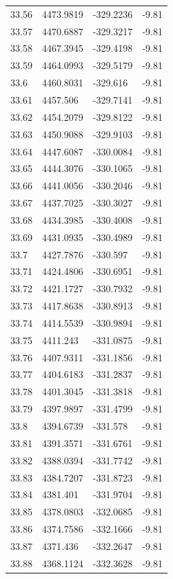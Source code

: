 \begin{table}[H]
\begin{tabular}{llll}
33.56 & 4473.9819 & -329.2236 & -9.81 \\
33.57 & 4470.6887 & -329.3217 & -9.81 \\
33.58 & 4467.3945 & -329.4198 & -9.81 \\
33.59 & 4464.0993 & -329.5179 & -9.81 \\
33.6 & 4460.8031 & -329.616 & -9.81 \\
33.61 & 4457.506 & -329.7141 & -9.81 \\
33.62 & 4454.2079 & -329.8122 & -9.81 \\
33.63 & 4450.9088 & -329.9103 & -9.81 \\
33.64 & 4447.6087 & -330.0084 & -9.81 \\
33.65 & 4444.3076 & -330.1065 & -9.81 \\
33.66 & 4441.0056 & -330.2046 & -9.81 \\
33.67 & 4437.7025 & -330.3027 & -9.81 \\
33.68 & 4434.3985 & -330.4008 & -9.81 \\
33.69 & 4431.0935 & -330.4989 & -9.81 \\
33.7 & 4427.7876 & -330.597 & -9.81 \\
33.71 & 4424.4806 & -330.6951 & -9.81 \\
33.72 & 4421.1727 & -330.7932 & -9.81 \\
33.73 & 4417.8638 & -330.8913 & -9.81 \\
33.74 & 4414.5539 & -330.9894 & -9.81 \\
33.75 & 4411.243 & -331.0875 & -9.81 \\
33.76 & 4407.9311 & -331.1856 & -9.81 \\
33.77 & 4404.6183 & -331.2837 & -9.81 \\
33.78 & 4401.3045 & -331.3818 & -9.81 \\
33.79 & 4397.9897 & -331.4799 & -9.81 \\
33.8 & 4394.6739 & -331.578 & -9.81 \\
33.81 & 4391.3571 & -331.6761 & -9.81 \\
33.82 & 4388.0394 & -331.7742 & -9.81 \\
33.83 & 4384.7207 & -331.8723 & -9.81 \\
33.84 & 4381.401 & -331.9704 & -9.81 \\
33.85 & 4378.0803 & -332.0685 & -9.81 \\
33.86 & 4374.7586 & -332.1666 & -9.81 \\
33.87 & 4371.436 & -332.2647 & -9.81 \\
33.88 & 4368.1124 & -332.3628 & -9.81 \\

\end{tabular}
\end{table}
